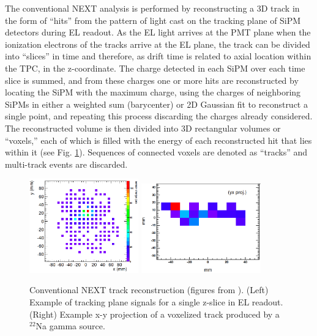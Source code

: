 \documentclass[11pt,a4paper]{article}
\begin{document}
The conventional NEXT analysis is performed by reconstructing a 3D track in the form of ``hits'' from the pattern of light cast on the tracking plane of SiPM detectors during EL readout. As the EL light arrives at the PMT plane when the ionization electrons of the tracks arrive at the EL plane, the track can be divided into ``slices'' in time and therefore, as drift time is related to axial location within the TPC, in the z-coordinate. The charge detected in each SiPM over each time slice is summed, and from these charges one or more hits are reconstructed by locating the SiPM with the maximum charge, using the charges of neighboring SiPMs in either a weighted sum (barycenter) or 2D Gaussian fit to reconstruct a single point, and repeating this process discarding the charges already considered. The reconstructed volume is then divided into 3D rectangular volumes or ``voxels,'' each of which is filled with the energy of each reconstructed hit that lies within it (see Fig. \ref{fig.recon}). Sequences of connected voxels are denoted as ``tracks'' and multi-track events are discarded.

\begin{figure}[!htb]
	\centering
	\includegraphics[width= 0.42\textwidth]{fig/sipm_map.png}
	\includegraphics[width= 0.46\textwidth]{fig/xy_proj.png}
	\caption{Conventional NEXT track reconstruction (figures from \cite{NEXT_topology}). (Left) Example of tracking plane signals for a single z-slice in EL readout. (Right) Example x-y projection of a voxelized track produced by a $^{22}$Na gamma source.} \label{fig.recon}
\end{figure}
\end{document}
